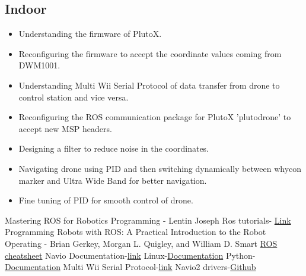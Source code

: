 \documentclass[a4paper,12pt,oneside]{book}
\begin{document}
\subsection{Indoor}
\begin{itemize}
\item Understanding the firmware of PlutoX.
\item Reconfiguring the firmware to accept the coordinate values coming from DWM1001.
\item Understanding Multi Wii Serial Protocol of data transfer from drone to control station and vice versa.
\item Reconfiguring the ROS communication package for PlutoX 'plutodrone' to accept new MSP headers.
\item Designing a filter to reduce noise in the coordinates.
\item Navigating drone using PID and then switching dynamically between whycon marker and Ultra Wide Band for better navigation.
\item Fine tuning of PID for smooth control of drone.
\end{itemize}

\begin{thebibliography}{li}
Mastering ROS for Robotics Programming - Lentin Joseph
Ros tutorials-
\href{http://wiki.ros.org/ROS/Tutorials}{Link}
Programming Robots with ROS: A Practical Introduction to the Robot
Operating - Brian Gerkey, Morgan L. Quigley, and William D. Smart
\href{http://www.tedusar.eu/files/summerschool2013/ROScheatsheet.pdf}{ROS cheatsheet}
Navio Documentation-\href{https://docs.emlid.com/navio2/}{link}
Linux-\href{https://ryanstutorials.net/linuxtutorial/}{Documentation}
Python-\href{https://www.tutorialspoint.com/python/}{Documentation}
Multi Wii Serial Protocol-\href{http://www.multiwii.com/wiki/index.php?title=Multiwii_Serial_Protocol}{link}
Navio2 drivers-\href{https://github.com/emlid/Navio2}{Github}
\end{thebibliography}
\end{document}
